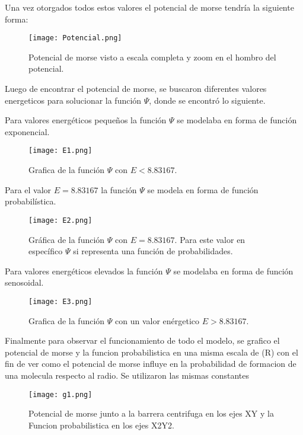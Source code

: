 \documentclass[twocolumn,preprintnumbers,amsmath,amssymb,aps,prl]{revtex4}
\begin{document}
Una vez otorgados todos estos valores el potencial de morse tendría la siguiente forma:

\begin{figure}[h!]
    \centering
    \texttt{[image: Potencial.png]}
    \caption{Potencial de morse visto a escala completa y zoom en el hombro del potencial.}
    \label{fig1}
\end{figure}

Luego de encontrar el potencial de morse, se buscaron diferentes valores energeticos para solucionar la función $\Psi$, donde se encontró lo siguiente.

Para valores energéticos pequeños la función $\Psi$ se modelaba en forma de función exponencial.

\begin{figure}[h!]
    \centering
    \texttt{[image: E1.png]}
    \caption{Grafica de la función $\Psi$ con $E<8.83167$.}
    \label{fig2}
\end{figure}
Para el valor $E=8.83167$ la función $\Psi$ se modela en forma de función probabilística.

\begin{figure}[h!]
    \centering
    \texttt{[image: E2.png]}
    \caption{Gráfica de la función $\Psi$ con $E=8.83167$. Para este valor en específico $\Psi$ si representa una función de probabilidades.}
    \label{fig3}
\end{figure}
Para valores energéticos elevados la función $\Psi$ se modelaba en forma de función senosoidal.
\begin{figure}[h!]
    \centering
    \texttt{[image: E3.png]}
    \caption{Grafica de la función $\Psi$ con un valor enérgetico $E>8.83167$.}
    \label{fig4}
\end{figure}

Finalmente para observar el funcionamiento de todo el modelo, se grafico el potencial de morse y la funcion probabilistica en una misma escala de (R) con el fin de ver como el potencial de morse influye en la probabilidad de formacion de una molecula respecto al radio. Se utilizaron las mismas constantes

\begin{figure}[h!]
    \centering
    \texttt{[image: g1.png]}
    \caption{Potencial de morse junto a la barrera centrifuga en los ejes XY y la Funcion probabilistica en los ejes X2Y2.}
    \label{fig5}
\end{figure}
\end{document}
